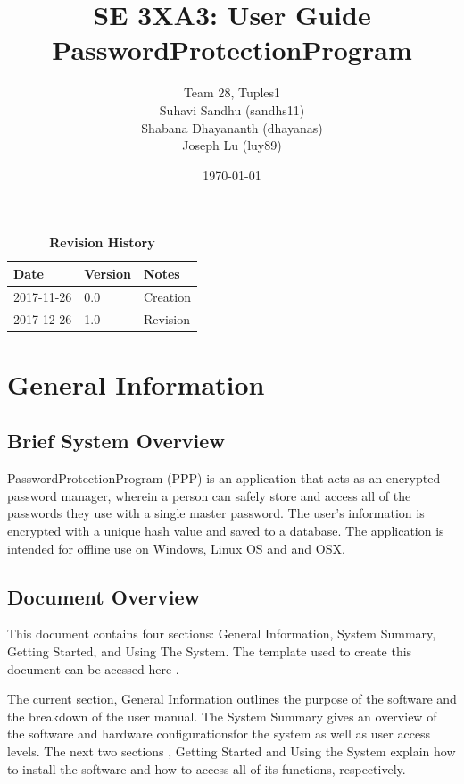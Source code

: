 \documentclass[12pt, titlepage]{article}
\title{SE 3XA3: User Guide\\PasswordProtectionProgram}
\author{Team 28, Tuples1
		\\ Suhavi Sandhu (sandhs11)
		\\ Shabana Dhayananth (dhayanas)
		\\ Joseph Lu (luy89)
}
\date{\today}
\begin{document}
\maketitle

\tableofcontents
\listoftables
\listoffigures

\begin{table}[bp]
\caption{\bf Revision History}
\begin{tabularx}{\textwidth}{p{3cm}p{2cm}X}
\toprule {\bf Date} & {\bf Version} & {\bf Notes}\\
\midrule
2017-11-26 & 0.0 & Creation\\
2017-12-26 & 1.0 & Revision\\
\bottomrule
\end{tabularx}
\end{table}

\newpage


\section{General Information}\label{Intro}

\subsection{Brief System Overview} \label{ProjOver}
PasswordProtectionProgram (PPP) is an application that acts as an encrypted password manager, wherein a person can safely store and access all of the passwords they use with a single master password. The user's information is encrypted with a unique hash value and saved to a database. The application is intended for offline use on Windows, Linux OS and and OSX.

\subsection{Document Overview} \label{DocOver}
This document contains four sections: General Information, System Summary, Getting Started, and Using The System. The template used to create this document can be acessed here \cite{TEMPLATE:1}.

The current section, General Information outlines the purpose of the software and the breakdown of the user manual. The System Summary gives an overview of the software and hardware configurationsfor the system as well as user access levels. The next two sections , Getting Started and Using the System explain how to install the software and how to access all of its functions, respectively.
\end{document}
